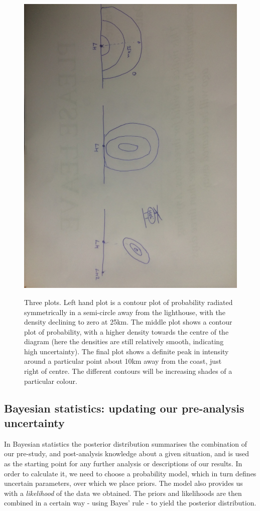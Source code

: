\documentclass[11pt,fullpage]{book}
\begin{document}
\begin{figure}
\centering
\scalebox{0.2} 
{\includegraphics{Posterior_bayesianLighthouse.jpg}}
\caption{Three plots. Left hand plot is a contour plot of probability radiated symmetrically in a semi-circle away from the lighthouse, with the density declining to zero at 25km. The middle plot shows a contour plot of probability, with a higher density towards the centre of the diagram (here the densities are still relatively smooth, indicating high uncertainty). The final plot shows a definite peak in intensity around a particular point about 10km away from the coast, just right of centre. The different contours will be increasing shades of a particular colour.}\label{fig:Posterior_bayesianLighthouse}
\end{figure}

\subsection{Bayesian statistics: updating our pre-analysis uncertainty}
In Bayesian statistics the posterior distribution summarises the combination of our pre-study, and post-analysis knowledge about a given situation, and is used as the starting point for any further analysis or descriptions of our results. In order to calculate it, we need to choose a probability model, which in turn defines uncertain parameters, over which we place priors. The model also provides us with a \textit{likelihood} of the data we obtained. The priors and likelihoods are then combined in a certain way - using Bayes' rule - to yield the posterior distribution.
\end{document}
